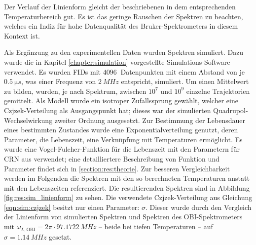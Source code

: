 Der Verlauf der Linienform gleicht der beschriebenen in dem entsprechenden Temperaturbereich gut. Es ist das geringe Rauschen der Spektren zu beachten, welches ein Indiz für hohe Datenqualität des Bruker-Spektrometers in diesem Kontext ist.

Als Ergänzung zu den experimentellen Daten wurden Spektren simuliert. Dazu wurde die in Kapitel \ref{chapter:simulation} vorgestellte Simulations-Software verwendet. Es wurden FIDs mit $\SI{4096}{}$ Datenpunkten mit einem Abstand von je $\SI{0.5}{\micro s}$, was einer Frequenz von $\SI{2}{MHz}$ entspricht, simuliert. Um einen Mittelwert zu bilden, wurden, je nach Spektrum, zwischen $10^{7}$ und $10^{9}$ einzelne Trajektorien gemittelt. Als Modell wurde ein isotroper Zufallssprung gewählt, welcher eine Czjzek-Verteilung als Ausgangspunkt hat; dieses war der simulierten Quadrupol-Wechselwirkung zweiter Ordnung ausgesetzt. Zur Bestimmung der Lebensdauer eines bestimmten Zustandes wurde eine Exponentialverteilung genutzt, deren Parameter, die Lebenszeit, eine Verknüpfung mit Temperaturen ermöglicht. Es wurde eine Vogel-Fulcher-Funktion für die Lebenszeit mit den Parametern für CRN aus \cite{PIMENOV199793} verwendet; eine detailliertere Beschreibung von Funktion und Parameter findet sich in \ref{section:res:theorie}. Zur besseren Vergleichbarkeit werden im Folgenden die Spektren mit den so berechneten Temperaturen anstatt mit den Lebenszeiten referenziert. Die resultierenden Spektren sind in Abbildung \ref{fig:res:sim_linienform} zu sehen. Die verwendete Czjzek-Verteilung aus Gleichung \eqref{eqn:sim:czjzek} besitzt nur einen Parameter: $\sigma$. Dieser wurde durch den Vergleich der Linienform von simulierten Spektren und Spektren des OBI-Spektrometers mit $\omega_{L, \text{OBI}} = 2\pi \cdot \SI{97.1722}{MHz}$ -- beide bei tiefen Temperaturen -- auf $\sigma = \SI{1.14}{MHz}$ gesetzt.
